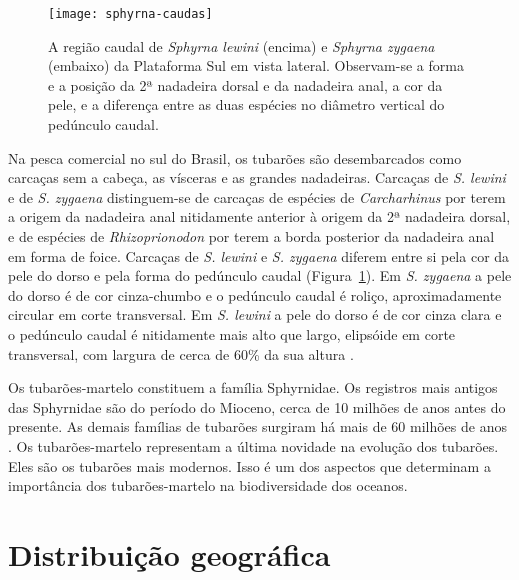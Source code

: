 \documentclass[a4paper,11pt,twoside,showtrims,onecolumn,openright,final]{memoir}
\begin{document}
%
%

\begin{figure}
\begin{center}
\texttt{[image: sphyrna-caudas]}
\end{center}
\caption[A região caudal de \emph{Sphyrna lewini} e \emph{Sphyrna zygaena}]
	{A região caudal de \emph{Sphyrna lewini} (encima) e \emph{Sphyrna zygaena} (embaixo) 
         da Plataforma Sul em vista lateral. Observam-se a forma e a posição da 2ª nadadeira dorsal 
         e da nadadeira anal, a cor da pele, e a diferença entre as duas espécies no diâmetro 
         vertical do pedúnculo caudal. }
\label{fig:martelos-caudas}
\end{figure}


Na pesca comercial no sul do Brasil, os tubarões são desembarcados como carcaças sem a cabeça, 
as vísceras e as grandes nadadeiras. Carcaças de \emph{S. lewini}  e de \emph{S. zygaena} distinguem-se 
de carcaças de espécies de \emph{Carcharhinus} por terem a origem da nadadeira anal nitidamente anterior 
à origem da 2ª  nadadeira dorsal, e de espécies de \emph{Rhizoprionodon} por terem a borda posterior 
da nadadeira anal em forma de foice. Carcaças de \emph{S. lewini} e \emph{S. zygaena} diferem entre si pela 
cor da pele do dorso e pela forma do pedúnculo caudal (Figura~\ref{fig:martelos-caudas}). 
Em \emph{S. zygaena} a pele do dorso é de cor cinza-chumbo e o pedúnculo caudal é roliço, 
aproximadamente circular em corte transversal. Em \emph{S. lewini} a pele do dorso é de cor cinza 
clara e o pedúnculo caudal é nitidamente mais alto que largo, elipsóide em corte transversal, 
com largura de cerca de 60\% da sua altura \citep{vooren2003}. %

Os tubarões-martelo constituem a família Sphyrnidae. Os registros mais antigos das Sphyrnidae 
são do período do Mioceno, cerca de 10 milhões de anos antes do presente. As demais famílias 
de tubarões surgiram há mais de 60 milhões de anos \citep{cappetta1987}. %
Os tubarões-martelo representam a última novidade na evolução dos tubarões. 
Eles são os tubarões mais modernos. Isso é um dos aspectos que determinam a importância 
dos tubarões-martelo na biodiversidade dos oceanos.

\section*{Distribuição geográfica}
\end{document}
